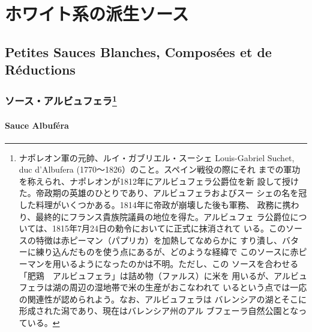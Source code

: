 \hypertarget{ux30dbux30efux30a4ux30c8ux7cfbux306eux6d3eux751fux30bdux30fcux30b9}{%
\section{ホワイト系の派生ソース}\label{ux30dbux30efux30a4ux30c8ux7cfbux306eux6d3eux751fux30bdux30fcux30b9}}

\hypertarget{petites-sauces-blanches-composuxe9es-et-de-ruxe9ductions}{%
\subsection{Petites Sauces Blanches, Composées et de
Réductions}\label{petites-sauces-blanches-composuxe9es-et-de-ruxe9ductions}}
\begin{recette}
\hypertarget{ux30bdux30fcux30b9ux30a2ux30ebux30d3ux30e5ux30d5ux30a7ux30e91}{%
\subsubsection[ソース・アルビュフェラ]{\texorpdfstring{ソース・アルビュフェラ\footnote{ナポレオン軍の元帥、ルイ・ガブリエル・スーシェ
  Louis-Gabriel Suchet, duc d'Albufera
  (1770〜1826）のこと。スペイン戦役の際にそれ
  までの軍功を称えられ、ナポレオンが1812年にアルビュフェラ公爵位を新
  設して授けた。帝政期の英雄のひとりであり、アルビュフェラおよびスー
  シェの名を冠した料理がいくつかある。1814年に帝政が崩壊した後も軍務、
  政務に携わり、最終的にフランス貴族院議員の地位を得た。アルビュフェ
  ラ公爵位については、1815年7月24日の勅令においてに正式に抹消されて
  いる。このソースの特徴は赤ピーマン（パプリカ）を加熱してなめらかに
  すり潰し、バターに練り込んだものを使う点にあるが、どのような経緯で
  このソースに赤ピーマンを用いるようになったのかは不明。ただし、この
  ソースを合わせる「肥鶏　アルビュフェラ」は詰め物（ファルス）に米を
  用いるが、アルビュフェラは湖の周辺の湿地帯で米の生産がおこなわれて
  いるという点では一応の関連性が認められよう。なお、アルビュフェラは
  バレンシアの湖とそこに形成された潟であり、現在はバレンシア州のアル
  ブフェーラ自然公園となっている。}}{ソース・アルビュフェラ}}\label{ux30bdux30fcux30b9ux30a2ux30ebux30d3ux30e5ux30d5ux30a7ux30e91}}

\hypertarget{sauce-albufera}{%
\paragraph{Sauce Albuféra}\label{sauce-albufera}}



\end{recette}
